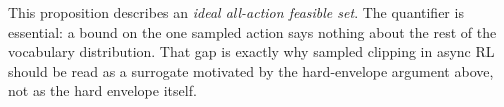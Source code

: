 This proposition describes an \emph{ideal all-action feasible set}. The quantifier is essential: a bound on the one sampled action says nothing about the rest of the vocabulary distribution. That gap is exactly why sampled clipping in async RL should be read as a surrogate motivated by the hard-envelope argument above, not as the hard envelope itself.




